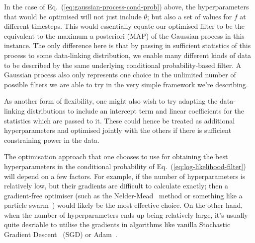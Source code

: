 In the case of Eq.~(\ref{eq:gaussian-process-cond-prob}) above, the hyperparameters that would be optimised will not just include $\theta$; but also a set of values for $f$ at different timesteps. This would essentially equate our optimised filter to be the equivalent to the maximum a posteriori (MAP) of the Gaussian process in this instance. The only difference here is that by passing in sufficient statistics of this process to some data-linking distribution, we enable many different kinds of data to be described by the same underlying conditional probability-based filter. A Gaussian process also only represents one choice in the unlimited number of possible filters we are able to try in the very simple framework we're describing. 

As another form of flexibility, one might also wish to try adapting the data-linking distributions to include an intercept term and linear coefficients for the statistics which are passed to it. These could hence be treated as additional hyperparameters and optimised jointly with the others if there is sufficient constraining power in the data.

The optimisation approach that one chooses to use for obtaining the best hyperparameters in the conditional probability of Eq.~(\ref{eq:log-likelihood-filter}) will depend on a few factors. For example, if the number of hyperparameters is relatively low, but their gradients are difficult to calculate exactly; then a gradient-free optimiser (such as the Nelder-Mead~\cite{nelder1965simplex} method or something like a particle swarm~\cite{kennedy1995particle, shi1998modified}) would likely be the most effective choice. On the other hand, when the number of hyperparameters ends up being relatively large, it's usually quite desriable to utilise the gradients in algorithms like vanilla Stochastic Gradient Descent~\cite{robbins1951stochastic} (SGD) or Adam~\cite{kingma2014adam}.

